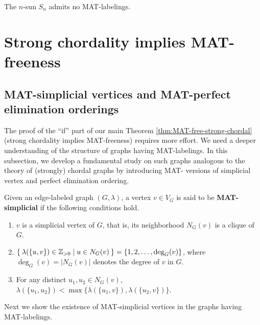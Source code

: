 \documentclass[ALCO, Unicode,published]{cedram}
\begin{document}
\begin{corollary}
The $ n $-sun $ S_{n} $ admits no MAT-labelings. 
\end{corollary}

\section{Strong chordality implies MAT-freeness}
\subsection{MAT-simplicial vertices and MAT-perfect elimination orderings}
\label{subsec:MAT-S-PEO}
 
The proof of the ``if'' part of our main Theorem \ref{thm:MAT-free-strong-chordal} (strong chordality implies MAT-freeness) requires more effort. 
We need a deeper understanding of the structure of graphs having MAT-labelings. 
In this subsection, we develop a fundamental study on such graphs analogous to the theory of (strongly) chordal graphs by introducing MAT- versions of simplicial vertex and perfect elimination ordering.
\begin{definition}
\label{definition MAT-simplicial}
Given an edge-labeled graph $ (G,\lambda) $, a vertex $ v \in V_{G} $ is said to be \textbf{MAT-simplicial} if the following conditions hold. 
\begin{enumerate}[(MS1)]
\item\label{definition MAT-simplicial 1} $ v $ is a simplicial vertex of $ G $, that is, its neighborhood $ N_{G}(v) $ is a clique of $ G $.
\item\label{definition MAT-simplicial 2} $ \Set{\lambda(\{u,v\}) \in \mathbb{Z}_{>0} | u \in N_{G}(v) } = \{1,2, \dots, \deg_{G}(v)\} $, where $ \deg_{G}(v) =|N_{G}(v) |$ denotes the degree  of $ v $ in $ G $. 
\item\label{definition MAT-simplicial 3} For any distinct  $ u_{1}, u_{2} \in N_{G}(v) $, $ \lambda(\{u_{1}, u_{2}\}) < \max\{\lambda(\{u_{1}, v\}), \lambda(\{u_{2}, v\})\} $. 
\end{enumerate}
\end{definition}


Next we show the existence of MAT-simplicial vertices in the graphs having MAT-labelings.
\end{document}
